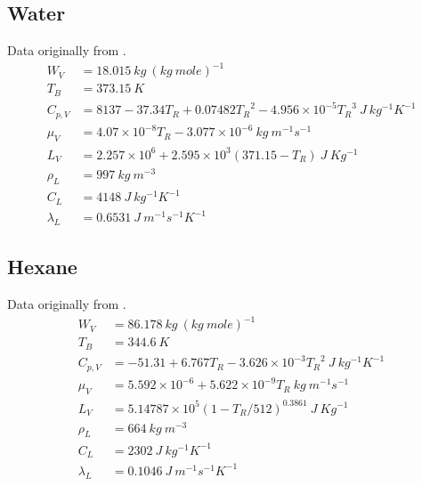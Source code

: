 \documentclass[../Interim_Report_Master]{subfiles}
\begin{document}
\subsection{Water}
Data originally from \cite{harpole1981}.
\begin{subequations}
\begin{align}
W_V &= 18.015~kg~(kg~mole)^{-1} \\
T_B &= 373.15~K \\
C_{p,V} &= 8137 - 37.34T_R + 0.07482{T_R}^2 - 4.956\times 10^{-5}{T_R}^3~J~kg^{-1}K^{-1} \\
\mu_V &= 4.07\times 10^{-8}T_R - 3.077\times 10^{-6}~kg~m^{-1}s^{-1} \\
L_V &= 2.257\times 10^{6} + 2.595\times 10^{3}(371.15-T_R)~J~Kg^{-1} \\
\rho_L &= 997~kg~m^{-3} \\
C_L &= 4148~J~kg^{-1}K^{-1} \\
\lambda_L &= 0.6531~J~m^{-1}s^{-1}K^{-1}
\end{align}
\end{subequations}

\subsection{Hexane}
Data originally from \cite{reid1987}.
\begin{subequations}
	\begin{align}
	W_V &= 86.178~kg~(kg~mole)^{-1} \\
	T_B &= 344.6~K \\
	C_{p,V} &= -51.31 + 6.767T_R - 3.626\times 10^{-3}{T_R}^2~J~kg^{-1}K^{-1} \\
	\mu_V &= 5.592\times 10^{-6} + 5.622\times 10^{-9}T_R~kg~m^{-1}s^{-1} \\
	L_V &= 5.14787\times 10^{5}(1-T_R/512)^{0.3861}~J~Kg^{-1} \\
	\rho_L &= 664~kg~m^{-3} \\
	C_L &= 2302~J~kg^{-1}K^{-1} \\
	\lambda_L &= 0.1046~J~m^{-1}s^{-1}K^{-1}
	\end{align}
\end{subequations}
\end{document}

